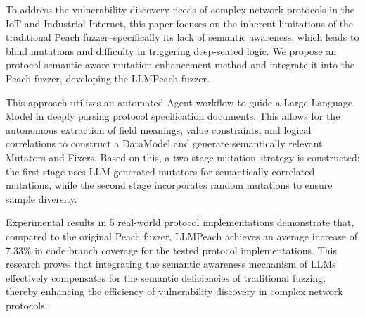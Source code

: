 \begin{abstract}
针对物联网与工业互联网中复杂网络协议的漏洞挖掘需求，
本文聚焦传统 Peach 模糊测试框架因语义感知能力不足导致变异盲目、难以触发深层逻辑的问题，
提出一种协议语义感知变异增强方法，并将其集成于 Peach 框架中，开发了 LLMPeach 模糊测试框架。

该方法通过设计自动化智能体流程引导大语言模型深度解析协议规范文档，
自主提取字段含义、取值约束及逻辑关联，构建数据模型，并生成语义相关的变异器与修复器。
在此基础上，构建两阶段变异策略——第一阶段通过大模型生成的变异器对协议字段进行语义关联的变异，第二阶段辅以随机变异以保障样本多样性。

在5个现实世界协议实现上的实验结果表明，相较于原始 Peach，
LLMPeach在被测协议实现代码分支覆盖上平均提高了 7.33\%。
研究证明，结合大语言模型的语义感知机制能有效弥补传统模糊测试在语义维度的缺陷，提升复杂网络协议的漏洞挖掘效率。
\end{abstract}

\begin{abstractEN}
To address the vulnerability discovery needs of complex network protocols in the IoT and Industrial Internet, this paper focuses on the inherent limitations of the traditional Peach fuzzer--specifically its lack of semantic awareness, which leads to blind mutations and difficulty in triggering deep-seated logic. We propose an protocol semantic-aware mutation enhancement method and integrate it into the Peach fuzzer, developing the LLMPeach fuzzer.

This approach utilizes an automated Agent workflow to guide a Large Language Model in deeply parsing protocol specification documents. This allows for the autonomous extraction of field meanings, value constraints, and logical correlations to construct a DataModel and generate semantically relevant Mutators and Fixers. Based on this, a two-stage mutation strategy is constructed: the first stage uses LLM-generated mutators for semantically correlated mutations, while the second stage incorporates random mutations to ensure sample diversity.

Experimental results in 5 real-world protocol implementations
demonstrate that, compared to the original Peach fuzzer, LLMPeach achieves an average increase of 7.33\% in code branch coverage for the tested protocol implementations.
This research proves that integrating the semantic awareness mechanism of LLMs effectively compensates for the semantic deficiencies of traditional fuzzing, thereby enhancing the efficiency of vulnerability discovery in complex network protocols.
\end{abstractEN}